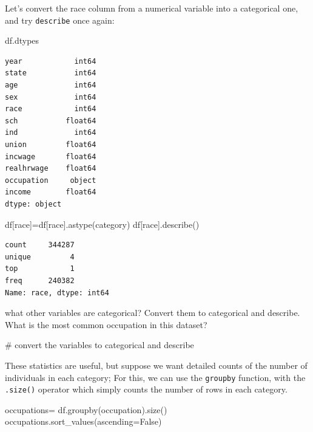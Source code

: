 \documentclass[
  letterpaper,
  DIV=11,
  numbers=noendperiod]{scrreprt}
\newenvironment{Shaded}{\begin{snugshade}}{\end{snugshade}}
\newcommand{\CommentTok}[1]{\textcolor[rgb]{0.37,0.37,0.37}{#1}}
\newcommand{\NormalTok}[1]{\textcolor[rgb]{0.00,0.23,0.31}{#1}}
\newcommand{\OperatorTok}[1]{\textcolor[rgb]{0.37,0.37,0.37}{#1}}
\newcommand{\StringTok}[1]{\textcolor[rgb]{0.13,0.47,0.30}{#1}}
\newcommand{\VariableTok}[1]{\textcolor[rgb]{0.07,0.07,0.07}{#1}}
\begin{document}
Let's convert the race column from a numerical variable into a
categorical one, and try \texttt{describe} once again:

\begin{Shaded}
\begin{Highlighting}[]
\NormalTok{df.dtypes}
\end{Highlighting}
\end{Shaded}

\begin{verbatim}
year            int64
state           int64
age             int64
sex             int64
race            int64
sch           float64
ind             int64
union         float64
incwage       float64
realhrwage    float64
occupation     object
income        float64
dtype: object
\end{verbatim}

\begin{Shaded}
\begin{Highlighting}[]
\NormalTok{df[}\StringTok{\textquotesingle{}race\textquotesingle{}}\NormalTok{]}\OperatorTok{=}\NormalTok{df[}\StringTok{\textquotesingle{}race\textquotesingle{}}\NormalTok{].astype(}\StringTok{\textquotesingle{}category\textquotesingle{}}\NormalTok{)}
\NormalTok{df[}\StringTok{\textquotesingle{}race\textquotesingle{}}\NormalTok{].describe()}
\end{Highlighting}
\end{Shaded}

\begin{verbatim}
count     344287
unique         4
top            1
freq      240382
Name: race, dtype: int64
\end{verbatim}

what other variables are categorical? Convert them to categorical and
describe. What is the most common occupation in this dataset?

\begin{Shaded}
\begin{Highlighting}[]
\CommentTok{\# convert the variables to categorical and describe}
\end{Highlighting}
\end{Shaded}

These statistics are useful, but suppose we want detailed counts of the
number of individuals in each category; For this, we can use the
\texttt{groupby} function, with the \texttt{.size()} operator which
simply counts the number of rows in each category.

\begin{Shaded}
\begin{Highlighting}[]
\NormalTok{occupations}\OperatorTok{=}\NormalTok{ df.groupby(}\StringTok{\textquotesingle{}occupation\textquotesingle{}}\NormalTok{).size()}
\NormalTok{occupations.sort\_values(ascending}\OperatorTok{=}\VariableTok{False}\NormalTok{)}
\end{Highlighting}
\end{Shaded}
\end{document}
